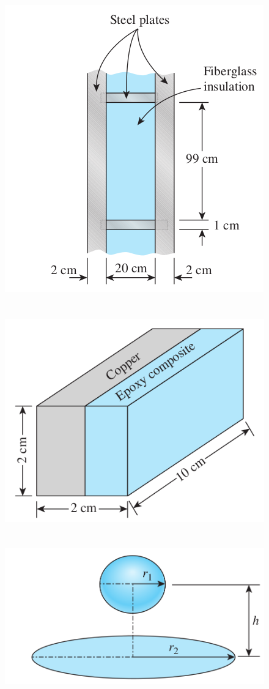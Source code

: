 \documentclass[a4paper,11pt]{article}
\begin{document}
\begin{figure}[H]
\centering
\includegraphics[width = 0.6\linewidth]{./image/lista1/q11}
\end{figure}

\section{} %

\section{} %

\begin{figure}[H]
\centering
\includegraphics[width = 0.6\linewidth]{./image/lista1/q13}
\end{figure}

\section{} %

\section{} %

\begin{figure}[H]
\centering
\includegraphics[width = 0.6\linewidth]{./image/lista1/q15}
\end{figure}

\end{document}
